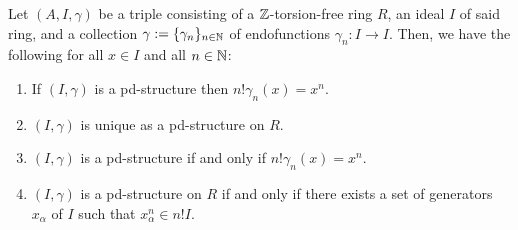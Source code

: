             \begin{proposition}
                Let $(A, I, \gamma)$ be a triple consisting of a $\mathbb{Z}$-torsion-free ring $R$, an ideal $I$ of said ring, and a collection $\gamma := \{\gamma_n\}_{n \in \mathbb{N}}$ of endofunctions $\gamma_n: I \to I$. Then, we have the following for all $x \in I$ and all $n \in \mathbb{N}$:
                    \begin{enumerate}
                        \item If $(I, \gamma)$ is a pd-structure then $n! \gamma_n(x) = x^n$.
                        \item $(I, \gamma)$ is unique as a pd-structure on $R$.
                        \item $(I, \gamma)$ is a pd-structure if and only if $n! \gamma_n(x) = x^n$. 
                        \item $(I, \gamma)$ is a pd-structure on $R$ if and only if there exists a set of generators $x_{\alpha}$ of $I$ such that $x_{\alpha}^n \in n! I$. 
                    \end{enumerate}
            \end{proposition}
